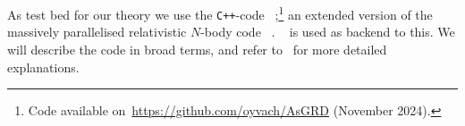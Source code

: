 




















As test bed for our theory we use the \texttt{C++}-code \gwasevolution~\citep{christiansenGravitationalWavesDark2024};\footnote{Code available on~\url{https://github.com/oyvach/AsGRD} (November 2024).} an extended version of the massively parallelised relativistic $N$-body code \gevolution~\citep{adamekGevolutionCosmologicalNbody2016}. \latfield~\citep{daverioLatfield2LibraryClassical2016} is used as backend to this. %
We will describe the code in broad terms, and refer to~\citet{christiansenAsevolutionRelativisticNbody2023,christiansenAsimulationDomainFormation2024,adamekGevolutionCosmologicalNbody2016,daverioLatfield2LibraryClassical2016} for more detailed explanations.



